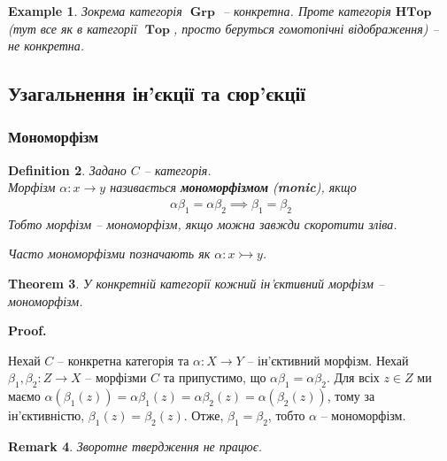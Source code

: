 \documentclass[a4paper, 10pt]{article}
\makeatletter
\theoremstyle{theoremdd}
\newtheorem{theorem}{Theorem}[subsection]
\newtheorem{definition}[theorem]{Definition}
\newtheorem{example}[theorem]{Example}
\newtheorem{remark}[theorem]{Remark}
\renewenvironment{proof}[1][Proof.\\]{\par
\pushQED{\hfill \qed}%
\normalfont \topsep6\p@\@plus6\p@\relax
\trivlist
\item\relax
{\bfseries
#1\@addpunct{.}}\hspace\labelsep\ignorespaces
}{%
\popQED\endtrivlist\@endpefalse
}
\DeclareMathOperator{\Grp}{\textbf{Grp}}
\DeclareMathOperator{\Top}{\textbf{Top}}
\makeatother
\begin{document}
\begin{example}
Зокрема категорія $\Grp$ -- конкретна. Проте категорія $\textbf{HTop}$ (тут все як в категорії $\Top$, просто беруться гомотопічні відображення) -- не конкретна.
\end{example}

\subsection{Узагальнення ін'єкції та сюр'єкції}
\subsubsection{Мономорфізм}
\begin{definition}
Задано $C$ -- категорія.\\
Морфізм $\alpha \colon x \to y$ називається \textbf{мономорфізмом} (\textbf{monic}), якщо
\begin{align*}
\alpha \beta_1 = \alpha \beta_2 \implies \beta_1 = \beta_2
\end{align*}
Тобто морфізм -- мономорфізм, якщо можна завжди скоротити зліва.
\begin{figure}[H]
\centering
{}
\end{figure}
\noindent
Часто мономорфізми позначають як $\alpha \colon x \rightarrowtail y$.
\end{definition}

\begin{theorem}
У конкретній категорії кожний ін'єктивний морфізм -- мономорфізм.
\end{theorem}

\begin{proof}
Нехай $C$ -- конкретна категорія та $\alpha \colon X \to Y$ -- ін'єктивний морфізм. Нехай $\beta_1, \beta_2 \colon Z \to X$ -- морфізми $C$ та припустимо, що $\alpha \beta_1 = \alpha \beta_2$. Для всіх $z \in Z$ ми маємо $\alpha(\beta_1(z)) = \alpha \beta_1 (z) = \alpha \beta_2(z) = \alpha(\beta_2(z))$, тому за ін'єктивністю, $\beta_1(z) = \beta_2(z)$. Отже, $\beta_1 = \beta_2$, тобто $\alpha$ -- мономорфізм.
\end{proof}

\begin{remark}
Зворотне твердження не працює.
\end{remark}
\end{document}
